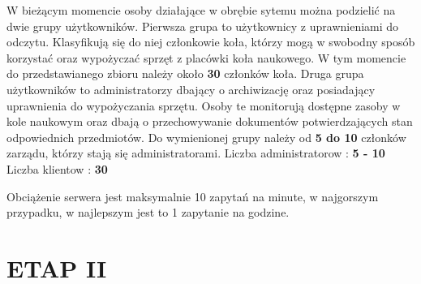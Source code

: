 \documentclass{article}
\begin{document}
    W bieżącym momencie osoby działające w obrębie sytemu można podzielić na dwie grupy użytkowników. Pierwsza grupa to użytkownicy z uprawnieniami do odczytu. Klasyfikują się do niej członkowie koła, którzy mogą w swobodny sposób korzystać oraz wypożyczać sprzęt z placówki koła naukowego. W tym momencie do przedstawianego zbioru należy około \textbf{30} członków koła. Druga grupa użytkowników to administratorzy dbający o archiwizację oraz posiadający uprawnienia do wypożyczania sprzętu. Osoby
    te monitorują dostępne zasoby w kole naukowym oraz dbają o przechowywanie dokumentów potwierdzających stan odpowiednich przedmiotów. Do wymienionej grupy należy od \textbf{5 do 10} członków zarządu, którzy stają się administratorami. \newline
    Liczba administratorow : \textbf{5 - 10} \newline
    Liczba klientow : \textbf{30}
    
    Obciążenie serwera jest maksymalnie 10 zapytań na minute, w najgorszym przypadku, w najlepszym jest to 1 zapytanie na godzine.
\section{\textbf{ETAP II}}
\end{document}
